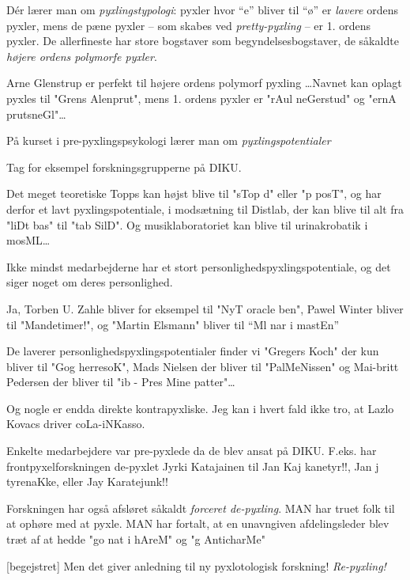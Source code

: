 \documentclass[danish]{article}
\begin{document}
\begin{sketch}
 Dér lærer man om \emph{pyxlingstypologi}: pyxler hvor ``e'' bliver
til ``ø'' er  \emph{lavere} ordens
pyxler, mens de pæne pyxler -- som skabes ved \emph{pretty-pyxling} -- er
1. ordens pyxler. De allerfineste har store bogstaver som
begyndelsesbogstaver, de såkaldte \emph{højere ordens polymorfe pyxler}.

 Arne Glenstrup er perfekt til højere ordens polymorf
pyxling \ldots  Navnet kan oplagt pyxles til "Grens
Alenprut", mens 1. ordens pyxler er "rAul neGerstud" og "ernA
prutsneGl"\ldots{}

 På kurset i pre-pyxlingspsykologi lærer man om
\emph{pyxlingspotentialer}

 Tag for eksempel forskningsgrupperne på DIKU.

Det meget teoretiske Topps kan højst blive til "sTop d" eller "p
posT", og har derfor et lavt pyxlingspotentiale, i modsætning til
 Distlab, der kan blive til alt fra
"liDt bas" til "tab SilD".  Og musiklaboratoriet kan blive til
urinakrobatik i mosML\ldots{}

 Ikke mindst medarbejderne har et stort
personlighedspyxlingspotentiale, og det siger noget om deres
personlighed.

 Ja, Torben U. Zahle bliver for eksempel til "NyT
oracle ben", Pawel Winter bliver til "Mandetimer!", og  "Martin
Elsmann" bliver til ``Ml nar i mastEn''%

 De laverer personlighedspyxlingspotentialer finder vi "Gregers Koch"
der kun bliver til "Gog herresoK", Mads Nielsen der bliver til
"PalMeNissen" og Mai-britt Pedersen der bliver til "ib - Pres Mine
patter"\ldots{}

 Og nogle er endda direkte kontrapyxliske. Jeg kan i hvert fald
ikke tro, at Lazlo Kovacs driver coLa-iNKasso.

 Enkelte medarbejdere var pre-pyxlede da de blev ansat på
DIKU. F.eks. har frontpyxelforskningen de-pyxlet Jyrki Katajainen til
Jan Kaj kanetyr!!, Jan j tyrenaKke, eller Jay Karatejunk!!

 Forskningen har også afsløret såkaldt \emph{forceret de-pyxling}.
MAN har truet folk til at ophøre med at pyxle.  MAN har fortalt, at en
unavngiven afdelingsleder blev træt af at hedde "go nat i hAreM" og "g
AnticharMe" 

[begejstret] Men det giver anledning til ny pyxlotologisk
forskning! \emph{Re-pyxling!}


\end{sketch}
\end{document}
